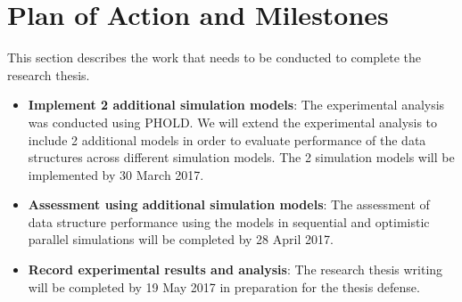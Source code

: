 \section{Plan of Action and Milestones}

This section describes the work that needs to be conducted to complete the research thesis.
\begin{itemize}

\item[\ding{182}] \textbf{ Implement 2 additional simulation models}: The experimental analysis was conducted using PHOLD. We will extend the experimental analysis to include 2 additional models in order to evaluate performance of the data structures across different simulation models. The 2 simulation models will be implemented by 30 March 2017.

\item[\ding{183}] \textbf{Assessment using additional simulation models}: The assessment of data structure performance using the models in sequential and optimistic parallel simulations will be completed by 28 April 2017.

\item[\ding{184}] \textbf{Record experimental results and analysis}: The research thesis writing will be completed by 19 May 2017 in preparation for the thesis defense.

\end{itemize}
